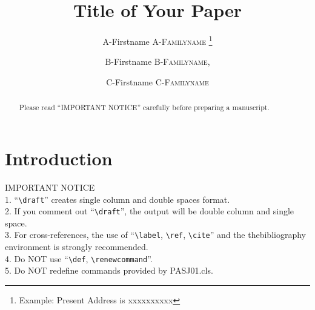 \documentclass[]{pasj01}
\begin{document}
 

\title{ 
Title of Your Paper }

\author{A-Firstname \textsc{A-Familyname}%
\thanks{Example: Present Address is xxxxxxxxxx}}

\author{B-Firstname \textsc{B-Familyname},}

\author{C-Firstname \textsc{C-Familyname}}



\maketitle

\begin{abstract}
Please read ``IMPORTANT NOTICE'' carefully before preparing a manuscript. 
\end{abstract}


\section{Introduction}

\noindent IMPORTANT NOTICE\\
1. ``\verb|\draft|'' creates single column and double spaces format.\\
2. If you comment out ``\verb|\draft|'', the output will be double column
   and single space.\\
3. For cross-references, the use of ``\verb|\label|, \verb|\ref|, \verb|\cite|'' 
   and the thebibliography environment is strongly recommended. \\
4. Do NOT use ``\verb|\def|, \verb|\renewcommand|''.\\
5. Do NOT redefine commands provided by PASJ01.cls.\\
\end{document}
